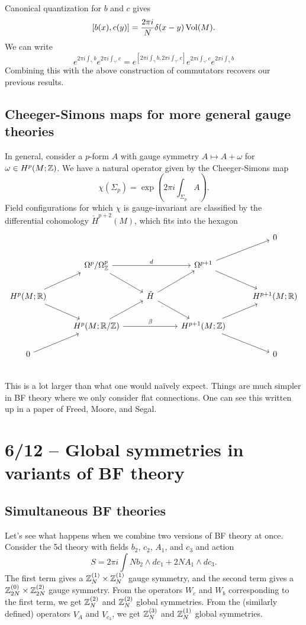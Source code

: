 Canonical quantization for $b$ and $c$ gives
\[
	[b(x), c(y)] = \frac{2\pi i}{N} \delta(x - y) \operatorname{Vol}(M).
\]
We can write
\[
	e^{2\pi i \int_\gamma b} e^{2\pi i \int_{\gamma'} c} = e^{\left[2\pi i \int_\gamma b, 2\pi i \int_{\gamma'} c\right]} e^{2\pi i \int_{\gamma'} c} e^{2\pi i \int_\gamma b}
\]
Combining this with the above construction of commutators recovers our previous results.

\subsection{Cheeger-Simons maps for more general gauge theories}

In general, consider a $p$-form $A$ with gauge symmetry $A \mapsto A + \omega$ for $\omega \in H^p(M; \mathbb{Z})$.
We have a natural operator given by the Cheeger-Simons map
\[
	\chi(\Sigma_p) = \exp\left(2\pi i \int_{\Sigma_p} A\right).
\]
Field configurations for which $\chi$ is gauge-invariant are classified by the differential cohomology $\check{H}^{p+2}(M)$, which fits into the hexagon
\[
	\begin{tikzcd}
		& & & & 0 \\
		& \Omega^p / \Omega^p_{\ZZ} \ar[rr, "d"] \ar[dr] & & \Omega^{p+1} \ar[ur] \ar[dr] & \\
		H^p(M; \RR) \ar[ur] \ar[dr] & & \check{H} \ar[ur] \ar[dr] & & H^{p+1}(M; \RR) \\
		& H^p(M; \RR / \ZZ) \ar[rr, "\beta"] \ar[ur] & & H^{p+1}(M; \ZZ) \ar[ur] \ar[dr] & \\
		0 \ar[ur] & & & & 0 \\
	\end{tikzcd}
\]
This is a lot larger than what one would na\"ively expect.
Things are much simpler in BF theory where we only consider flat connections.
One can see this written up in a paper of Freed, Moore, and Segal.

\section{6/12 -- Global symmetries in variants of BF theory}

\subsection{Simultaneous BF theories}

Let's see what happens when we combine two versions of BF theory at once.
Consider the 5d theory with fields $b_2$, $c_2$, $A_1$, and $c_3$ and action
\[
	S = 2 \pi i \int N b_2 \wedge dc_1 + 2N A_1 \wedge dc_3.
\]
The first term gives a $\mathbb{Z}_N^{(1)} \times \mathbb{Z}_N^{(1)}$ gauge symmetry, and the second term gives a $\mathbb{Z}_{2N}^{(0)} \times \mathbb{Z}_{2N}^{(2)}$ gauge symmetry.
From the operators $W_c$ and $W_b$ corresponding to the first term, we get $\mathbb{Z}_N^{(2)}$ and $\mathbb{Z}_N^{(2)}$ global symmetries.
From the (similarly defined) operators $V_A$ and $V_{c_3}$, we get $\mathbb{Z}_N^{(3)}$ and $\mathbb{Z}_N^{(1)}$ global symmetries.


